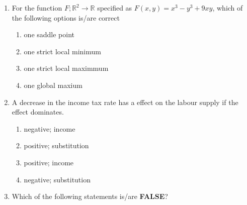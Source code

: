 \documentclass{article}
\begin{document}
\begin{enumerate}[leftmargin=*, start=45, label=Q.\arabic*.]
    \begin{multicols}{2}
    \begin{enumerate}
        \item enter; accommodate
        \item enter; fight
        \item not enter; accommodate
        \item not enter; fight 
    \end{enumerate}
    \end{multicols}

    \item For the function $F;\mathbb{R}^2\rightarrow\mathbb{R}$ specified as $F(x,y)=x^3-y^3+9xy$, which of the following options is/are correct

    \begin{multicols}{2}
    \begin{enumerate}
        \item one saddle point 
        \item one strict local minimum
        \item one strict local maximmum
        \item one global maxium
    \end{enumerate}
    \end{multicols}

    \item A decrease in the income tax rate has a \makebox[1cm]{\hrulefill} effect on the labour supply if the \makebox[1cm]{\hrulefill} effect dominates.

    \begin{multicols}{2}
    \begin{enumerate}
        \item negative; income
        \item positive; substitution
        \item positive; income
        \item negative; substitution
    \end{enumerate}
    \end{multicols}

    \item Which of the following statements is/are \textbf{FALSE}?


\end{enumerate}
\end{document}
